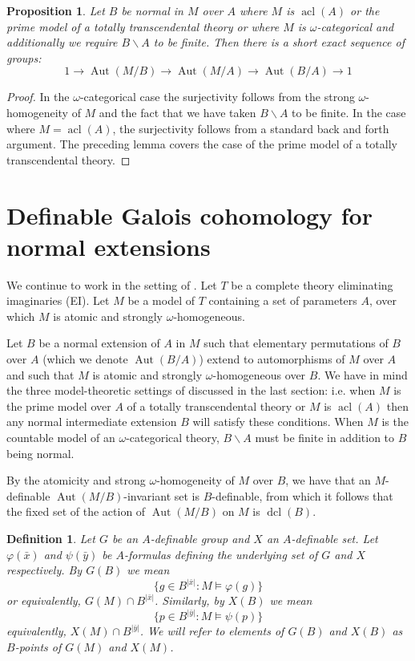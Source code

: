 \documentclass{article}
\theoremstyle{problemstyle}
\newtheorem{definition}[problem]{Definition}
\newtheorem{proposition}[problem]{Proposition}
\DeclareMathOperator{\aut}{Aut} %
\DeclareMathOperator{\acl}{acl} %
\DeclareMathOperator{\dcl}{dcl} %
\begin{document}
\begin{proposition}
    Let $B$ be normal in $M$ over $A$ where $M$ is $\acl(A)$ or the prime model of a totally transcendental theory or where $M$ is $\omega$-categorical and additionally we require $B\backslash A$ to be finite. Then there is a short exact sequence of groups: $$1 \to \aut(M/B) \to \aut(M/A) \to \aut(B/A) \to 1$$
\end{proposition}

\begin{proof}
    In the $\omega$-categorical case the surjectivity follows from the strong $\omega$-homogeneity of $M$ and the fact that we have taken $B\backslash A$ to be finite. In the case where $M = \acl(A)$, the surjectivity follows from a standard back and forth argument. The preceding lemma covers the case of the prime model of a totally transcendental theory. 
\end{proof}

\section{Definable Galois cohomology for normal extensions}

We continue to work in the setting of \cite{pillay_1997}. Let $T$ be a complete theory eliminating imaginaries (EI). Let $M$ be a model of $T$ containing a set of parameters $A$, over which $M$ is atomic and strongly $\omega$-homogeneous. 

Let $B$ be a normal extension of $A$ in $M$ such that elementary permutations of $B$ over $A$ (which we denote $\aut(B/A)$) extend to automorphisms of $M$ over $A$ and such that $M$ is atomic and strongly $\omega$-homogeneous over $B$. We have in mind the three model-theoretic settings of \cite{pillay_1997} discussed in the last section: i.e. when $M$ is the prime model over $A$ of a totally transcendental theory or $M$ is $\acl(A)$ then any normal intermediate extension $B$ will satisfy these conditions. When $M$ is the countable model of an $\omega$-categorical theory, $B\backslash A$ must be finite in addition to $B$ being normal.  

By the atomicity and strong $\omega$-homogeneity of $M$ over $B$, we have that an $M$-definable $\aut(M/B)$-invariant set is $B$-definable, from which it follows that the fixed set of the action of $\aut(M/B)$ on $M$ is $\dcl(B)$.  

\begin{definition}
    Let $G$ be an $A$-definable group and $X$ an $A$-definable set. Let $\varphi(\bar{x})$ and $\psi(\bar{y})$ be $A$-formulas defining the underlying set of $G$ and $X$ respectively. By $G(B)$ we mean $$\{g \in B^{|\bar{x}|} :  M \models \varphi(g) \}$$ or equivalently, $G(M) \cap B^{|\bar{x}|}$.  Similarly, by $X(B)$ we mean $$\{p \in B^{|\bar{y}|} : 
 M  \models \psi(p)\}$$ equivalently, $X(M)\cap B^{|\bar{y}|}$. We will refer to elements of $G(B)$ and $X(B)$ as $B$-points of $G(M)$ and $X(M)$.
\end{definition}
\end{document}
